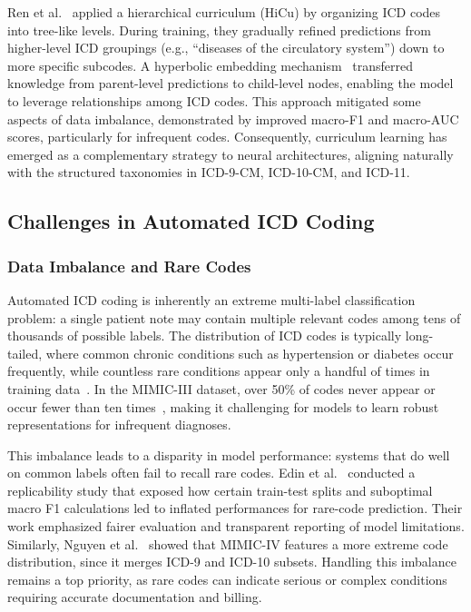 Ren et al.~\citep{ren2022hicu} applied a hierarchical curriculum (HiCu) by organizing ICD codes into tree-like levels. During training, they gradually refined predictions from higher-level ICD groupings (e.g., ``diseases of the circulatory system'') down to more specific subcodes. A hyperbolic embedding mechanism~\citep{nickel2017poincare} transferred knowledge from parent-level predictions to child-level nodes, enabling the model to leverage relationships among ICD codes. This approach mitigated some aspects of data imbalance, demonstrated by improved macro-F1 and macro-AUC scores, particularly for infrequent codes. Consequently, curriculum learning has emerged as a complementary strategy to neural architectures, aligning naturally with the structured taxonomies in ICD-9-CM, ICD-10-CM, and ICD-11.

\subsection{Challenges in Automated ICD Coding}\label{sec:p1:challenges}

\subsubsection{Data Imbalance and Rare Codes}

Automated ICD coding is inherently an extreme multi-label classification problem: a single patient note may contain multiple relevant codes among tens of thousands of possible labels. The distribution of ICD codes is typically long-tailed, where common chronic conditions such as hypertension or diabetes occur frequently, while countless rare conditions appear only a handful of times in training data~\citep{rios2018few}. In the MIMIC-III dataset, over 50\% of codes never appear or occur fewer than ten times~\citep{johnson2016mimic}, making it challenging for models to learn robust representations for infrequent diagnoses.

This imbalance leads to a disparity in model performance: systems that do well on common labels often fail to recall rare codes. Edin et al.~\citep{edin2023automated} conducted a replicability study that exposed how certain train-test splits and suboptimal macro F1 calculations led to inflated performances for rare-code prediction. Their work emphasized fairer evaluation and transparent reporting of model limitations. Similarly, Nguyen et al.~\citep{nguyen2023mimicivicd} showed that MIMIC-IV features a more extreme code distribution, since it merges ICD-9 and ICD-10 subsets. Handling this imbalance remains a top priority, as rare codes can indicate serious or complex conditions requiring accurate documentation and billing.

